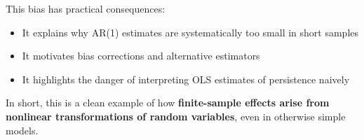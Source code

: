 \documentclass[11pt]{article}
\providecommand{\tightlist}{%
      \setlength{\itemsep}{0pt}\setlength{\parskip}{0pt}}
\begin{document}
This bias has practical consequences:

\begin{itemize}
\tightlist
\item
  It explains why AR(1) estimates are systematically too small in short
  samples
\item
  It motivates bias corrections and alternative estimators
\item
  It highlights the danger of interpreting OLS estimates of persistence
  naively
\end{itemize}

In short, this is a clean example of how \textbf{finite-sample effects
arise from nonlinear transformations of random variables}, even in
otherwise simple models.


    
    
    
\end{document}
